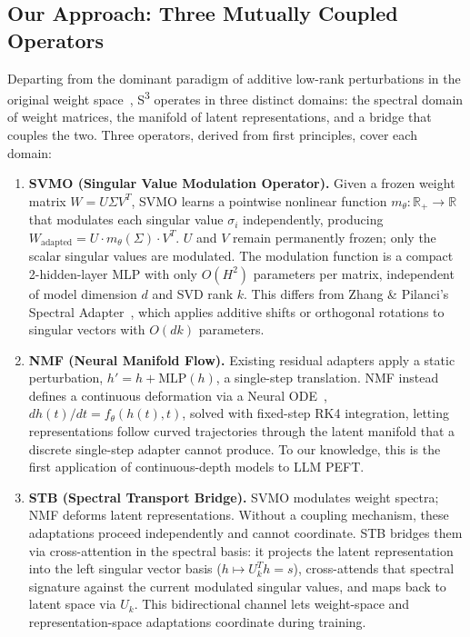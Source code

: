 \documentclass[conference]{IEEEtran}
\newcommand{\svmo}{\textsc{SVMO}}
\newcommand{\nmf}{\textsc{NMF}}
\newcommand{\stb}{\textsc{STB}}
\newcommand{\sthree}{S\textsuperscript{3}}
\begin{document}
\subsection{Our Approach: Three Mutually Coupled Operators}

Departing from the dominant paradigm of additive low-rank perturbations in the original weight space~\cite{hu2021lora}, \sthree{} operates in three distinct domains: the spectral domain of weight matrices, the manifold of latent representations, and a bridge that couples the two. Three operators, derived from first principles, cover each domain:

\begin{enumerate}[leftmargin=*]
    \item \textbf{\svmo{} (Singular Value Modulation Operator).} Given a frozen weight matrix $W = U\Sigma V^T$, \svmo{} learns a pointwise nonlinear function $m_\theta: \mathbb{R}_+ \to \mathbb{R}$ that modulates each singular value $\sigma_i$ independently, producing $W_{\text{adapted}} = U \cdot m_\theta(\Sigma) \cdot V^T$. $U$ and $V$ remain permanently frozen; only the scalar singular values are modulated. The modulation function is a compact 2-hidden-layer MLP with only $O(H^2)$ parameters per matrix, independent of model dimension $d$ and SVD rank $k$. This differs from Zhang \& Pilanci's Spectral Adapter~\cite{zhang2024spectral}, which applies additive shifts or orthogonal rotations to singular vectors with $O(dk)$ parameters.

    \item \textbf{\nmf{} (Neural Manifold Flow).} Existing residual adapters apply a static perturbation, $h' = h + \text{MLP}(h)$, a single-step translation. \nmf{} instead defines a continuous deformation via a Neural ODE~\cite{chen2018neuralode}, $dh(t)/dt = f_\theta(h(t), t)$, solved with fixed-step RK4 integration, letting representations follow curved trajectories through the latent manifold that a discrete single-step adapter cannot produce. To our knowledge, this is the first application of continuous-depth models to LLM PEFT.

    \item \textbf{\stb{} (Spectral Transport Bridge).} \svmo{} modulates weight spectra; \nmf{} deforms latent representations. Without a coupling mechanism, these adaptations proceed independently and cannot coordinate. \stb{} bridges them via cross-attention in the spectral basis: it projects the latent representation into the left singular vector basis ($h \mapsto U_k^T h = s$), cross-attends that spectral signature against the current modulated singular values, and maps back to latent space via $U_k$. This bidirectional channel lets weight-space and representation-space adaptations coordinate during training.
\end{enumerate}
\end{document}

